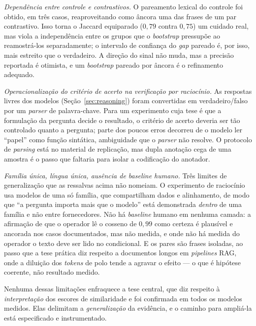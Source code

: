 \documentclass[11pt]{article}
\begin{document}
\textit{Dependência entre controle e contrastivos.} O pareamento lexical do
controle foi obtido, em três casos, reaproveitando como âncora uma das frases de um
par contrastivo. Isso torna o Jaccard equiparado ($0{,}79$ contra $0{,}75$) um
cuidado real, mas viola a independência entre os grupos que o \textit{bootstrap}
pressupõe ao reamostrá-los separadamente; o intervalo de confiança do \textit{gap}
pareado é, por isso, mais estreito que o verdadeiro. A direção do sinal não muda,
mas a precisão reportada é otimista, e um \textit{bootstrap} pareado por âncora é o
refinamento adequado.

\textit{Operacionalização do critério de acerto na verificação por raciocínio.} As
respostas livres dos modelos (Seção~\ref{sec:reasoning}) foram convertidas em
verdadeiro/falso por um \textit{parser} de palavra-chave. Para um experimento cuja
tese é que a formulação da pergunta decide o resultado, o critério de acerto deveria
ser tão controlado quanto a pergunta; parte dos poucos erros decorreu de o modelo
ler ``papel'' como função sintática, ambiguidade que o \textit{parser} não resolve.
O protocolo de \textit{parsing} está no material de replicação, mas dupla anotação
cega de uma amostra é o passo que faltaria para isolar a codificação do anotador.

\textit{Família única, língua única, ausência de \textit{baseline} humano.} Três
limites de generalização que as ressalvas acima não nomeiam. O experimento de
raciocínio usa modelos de uma só família, que compartilham dados e alinhamento, de
modo que ``a pergunta importa mais que o modelo'' está demonstrada \emph{dentro} de
uma família e não entre fornecedores. Não há \textit{baseline} humano em nenhuma
camada: a afirmação de que o operador lê o cosseno de $0{,}99$ como certeza é
plausível e ancorada nos casos documentados, mas não medida, e onde não há medida
do operador o texto deve ser lido no condicional. E os pares são frases isoladas,
ao passo que a tese prática diz respeito a documentos longos em \textit{pipelines}
RAG, onde a diluição dos \textit{tokens} de polo tende a agravar o efeito --- o que
é hipótese coerente, não resultado medido.

Nenhuma dessas limitações enfraquece a tese central, que diz respeito à
\emph{interpretação} dos escores de similaridade e foi confirmada em todos os
modelos medidos. Elas delimitam a \emph{generalização} da evidência, e o caminho
para ampliá-la está especificado e instrumentado.

\end{document}

